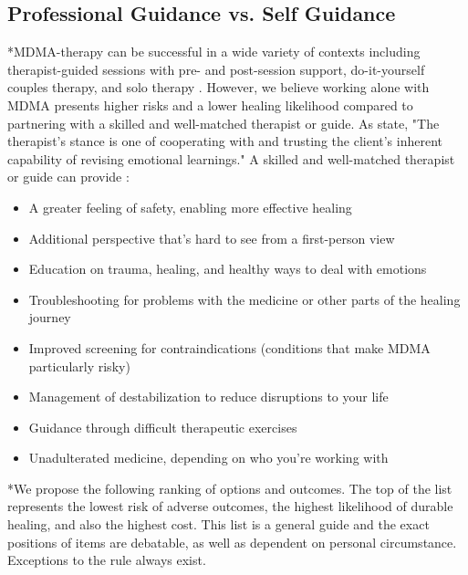\documentclass[12pt,letterpaper]{article}
\begin{document}
\subsection{Professional Guidance vs. Self Guidance}
\label{profressionalVSSelf}
*MDMA-therapy can be successful in a wide variety of contexts including therapist-guided sessions with pre- and post-session support, do-it-yourself couples therapy, and solo therapy \cite{mitchellMDMAClinicalTrial2,colbertEvenings,hillsSolo}. However, we believe working alone with MDMA presents higher risks and a lower healing likelihood compared to partnering with a skilled and well-matched therapist or guide. As \textcite{eckerUnlocking} state, "The therapist’s stance is one of cooperating with and trusting the client’s inherent capability of revising emotional learnings." A skilled and well-matched therapist or guide can provide \cite{mithoeferManual}:
\begin{itemize}
    \item A greater feeling of safety, enabling more effective healing
    \item Additional perspective that's hard to see from a first-person view
    \item Education on trauma, healing, and healthy ways to deal with emotions
    \item Troubleshooting for problems with the medicine or other parts of the healing journey
    \item Improved screening for contraindications (conditions that make MDMA particularly risky)
    \item Management of destabilization to reduce disruptions to your life
    \item Guidance through difficult therapeutic exercises 
    \item Unadulterated medicine, depending on who you're working with
\end{itemize}
*We propose the following ranking of options and outcomes. The top of the list represents the lowest risk of adverse outcomes, the highest likelihood of durable healing, and also the highest cost. This list is a general guide and the exact positions of items are debatable, as well as dependent on personal circumstance. Exceptions to the rule always exist.
\end{document}
